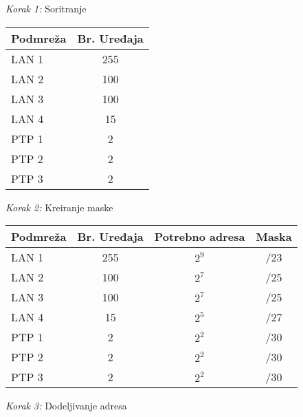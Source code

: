 \textit{Korak 1:} Soritranje
\begin{table}[H]
\begin{center}
\begin{tabular}{lc}
\textbf{Podmreža} & \textbf{Br. Uređaja} \\\hline\hline
LAN 1 & 255         \\
LAN 2 & 100         \\
LAN 3 & 100         \\
LAN 4 & 15          \\
PTP 1 & 2           \\
PTP 2 & 2           \\
PTP 3 & 2          
\end{tabular}
\label{tab:podm_pr1_sortirani_uredjaji}
\end{center}
\end{table}
\textit{Korak 2:} Kreiranje maske
\begin{table}[H]
\begin{center}
\begin{tabular}{lccc}
\textbf{Podmreža} & \textbf{Br. Uređaja} & \textbf{Potrebno adresa} & \textbf{Maska} \\\hline\hline
LAN 1 & 255         & $2^9$               & /23      \\
LAN 2 & 100         & $2^7$               & /25      \\
LAN 3 & 100         & $2^7$               & /25      \\
LAN 4 & 15          & $2^5$               & /27      \\
PTP 1 & 2           & $2^2$               & /30      \\
PTP 2 & 2           & $2^2$               & /30      \\
PTP 3 & 2           & $2^2$               & /30     
\end{tabular}
\label{tab:podm_pr1_maska}
\end{center}
\end{table}
\textit{Korak 3:} Dodeljivanje adresa
